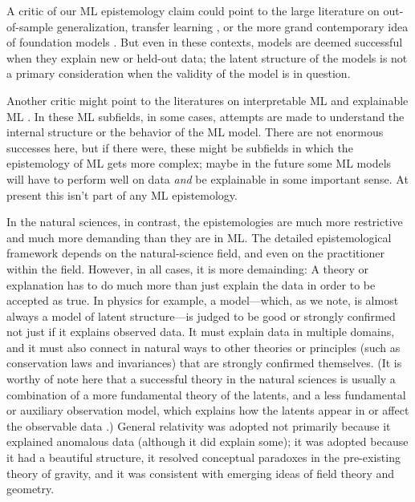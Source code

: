 \documentclass[11pt]{article}
\begin{document}
A critic of our ML epistemology claim could point to the large literature on out-of-sample generalization, transfer learning \cite{transfer}, or the more grand contemporary idea of foundation models \cite{foundation}.
But even in these contexts, models are deemed successful when they explain new or held-out data; the latent structure of the models is not a primary consideration when the validity of the model is in question.

Another critic might point to the literatures on interpretable ML \cite{interpretable} and explainable ML \cite{explainable}.
In these ML subfields, in some cases, attempts are made to understand the internal structure or the behavior of the ML model.
There are not enormous successes here, but if there were, these might be subfields in which the epistemology of ML gets more complex; maybe in the future some ML models will have to perform well on data \emph{and} be explainable in some important sense.
At present this isn't part of any ML epistemology.

In the natural sciences, in contrast, the epistemologies are much more restrictive and much more demanding than they are in ML.
The detailed epistemological framework depends on the natural-science field, and even on the practitioner within the field.
However, in all cases, it is more demainding:
A theory or explanation has to do much more than just explain the data in order to be accepted as true.
In physics for example, a model---which, as we note, is almost always a model of latent structure---is judged to be good or strongly confirmed not just if it explains observed data.
It must explain data in multiple domains, and it must also connect in natural ways to other theories or principles (such as conservation laws and invariances) that are strongly confirmed themselves.
(It is worthy of note here that a successful theory in the natural sciences is usually a combination of a more fundamental theory of the latents, and a less fundamental or auxiliary observation model, which explains how the latents appear in or affect the observable data \cite{auxiliary}.)
General relativity \cite{gr} was adopted not primarily because it explained anomalous data (although it did explain some); it was adopted because it had a beautiful structure, it resolved conceptual paradoxes in the pre-existing theory of gravity, and it was consistent with emerging ideas of field theory and geometry.
\end{document}
